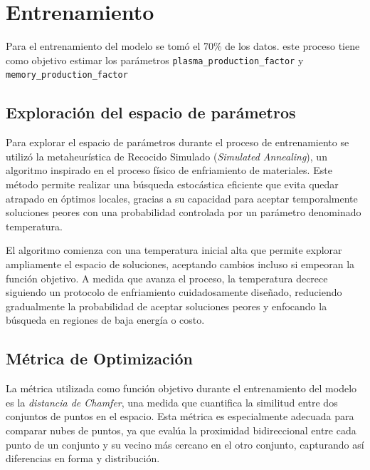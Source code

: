 \section{Entrenamiento}
Para el entrenamiento del modelo se tomó el 70\% de los datos. este proceso tiene como objetivo estimar los parámetros \texttt{plasma\_production\_factor} y \texttt{memory\_production\_factor}

\subsection{Exploración del espacio de parámetros}

Para explorar el espacio de parámetros durante el proceso de entrenamiento se utilizó la metaheurística de Recocido Simulado (\textit{Simulated Annealing}), un algoritmo inspirado en el proceso físico de enfriamiento de materiales. Este método permite realizar una búsqueda estocástica eficiente que evita quedar atrapado en óptimos locales, gracias a su capacidad para aceptar temporalmente soluciones peores con una probabilidad controlada por un parámetro denominado temperatura.

El algoritmo comienza con una temperatura inicial alta que permite explorar ampliamente el espacio de soluciones, aceptando cambios incluso si empeoran la función objetivo. A medida que avanza el proceso, la temperatura decrece siguiendo un protocolo de enfriamiento cuidadosamente diseñado, reduciendo gradualmente la probabilidad de aceptar soluciones peores y enfocando la búsqueda en regiones de baja energía o costo.



\subsection{Métrica de Optimización}

La métrica utilizada como función objetivo durante el entrenamiento del modelo es la \textit{distancia de Chamfer}, una medida que cuantifica la similitud entre dos conjuntos de puntos en el espacio. Esta métrica es especialmente adecuada para comparar nubes de puntos, ya que evalúa la proximidad bidireccional entre cada punto de un conjunto y su vecino más cercano en el otro conjunto, capturando así diferencias en forma y distribución.

